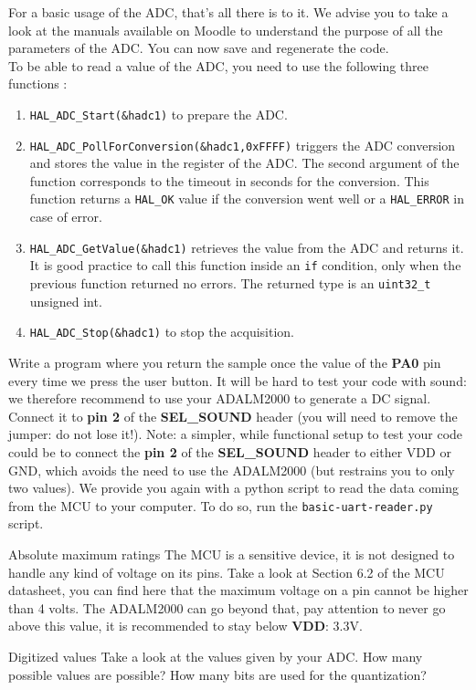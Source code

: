 For a basic usage of the ADC, that's all there is to it. We advise you to take a look at the manuals available on Moodle to understand the purpose of all the parameters of the ADC. You can now save and regenerate the code.\\

\noindent To be able to read a value of the ADC, you need to use the following three functions :
\begin{enumerate}
    \item \texttt{HAL\_ADC\_Start(\&hadc1)} to prepare the ADC.
    \item \texttt{HAL\_ADC\_PollForConversion(\&hadc1,0xFFFF)} triggers the ADC conversion and stores the value in the register of the ADC. The second argument of the function corresponds to the timeout in seconds for the conversion. This function returns a \texttt{HAL\_OK} value if the conversion went well or a \texttt{HAL\_ERROR} in case of error.
    \item \texttt{HAL\_ADC\_GetValue(\&hadc1)} retrieves the value from the ADC and returns it. It is good practice to call this function inside an \texttt{if} condition, only when the previous function returned no errors. The returned type is an \texttt{uint32\_t} unsigned int.
    \item \texttt{HAL\_ADC\_Stop(\&hadc1)} to stop the acquisition.
 \end{enumerate}

\noindent Write a program where you return the sample once the value of the \textbf{PA0} pin every time we press the user button. It will be hard to test your code with sound: we therefore recommend to use your ADALM2000 to generate a DC signal. Connect it to \textbf{pin 2} of the \textbf{SEL\_SOUND} header (you will need to remove the jumper: do not lose it!). Note: a simpler, while functional setup to test your code could be to connect the \textbf{pin 2} of the \textbf{SEL\_SOUND} header to either VDD or GND, which avoids the need to use the ADALM2000 (but restrains you to only two values). We provide you again with a python script to read the data coming from the MCU to your computer. To do so, run the \texttt{basic-uart-reader.py} script.\\
\begin{bclogo}[couleur = gray!20, arrondi = 0.2, logo=\bcattention]{Absolute maximum ratings}
The MCU is a sensitive device, it is not designed to handle any kind of voltage on its pins. Take a look at Section 6.2 of the MCU datasheet, you can find here that the maximum voltage on a pin cannot be higher than 4 volts. The ADALM2000 can go beyond that, pay attention to never go above this value, it is recommended to stay below \textbf{VDD}: 3.3V.
\end{bclogo}
\begin{bclogo}[couleur = gray!20, arrondi = 0.2, logo=\bcquestion]{Digitized values}
Take a look at the values given by your ADC. How many possible values are possible? How many bits are used for the quantization?
\end{bclogo}

